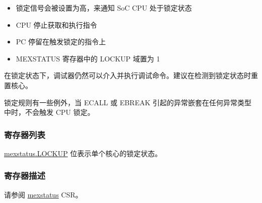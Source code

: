 \documentclass[main\_\_CN.tex]{subfiles}
\begin{document}
\begin{itemize}
    \item 锁定信号会被设置为高，来通知 SoC CPU 处于锁定状态
    \item CPU 停止获取和执行指令
    \item PC 停留在触发锁定的指令上
    \item MEXSTATUS 寄存器中的 LOCKUP 域置为 1
\end{itemize}

在锁定状态下，调试器仍然可以介入并执行调试命令。建议在检测到锁定状态时重置核心。

锁定规则有一些例外，当 ECALL 或 EBREAK 引起的异常嵌套在任何异常类型中时，不会触发 CPU 锁定。

\subsubsection{寄存器列表}
\label{sec:riscvcpu-custom-lockup-reg-summ}

\hyperref[fielddesc:MEXSTATUS_LOCKUP]{mexstatus.LOCKUP} 位表示单个核心的锁定状态。

\subsubsection{寄存器描述}
\label{sec:riscvcpu-custom-lockup-reg-desc}
请参阅 \hyperref[regdesc:MEXSTATUS]{mexstatus} CSR。
\end{document}
